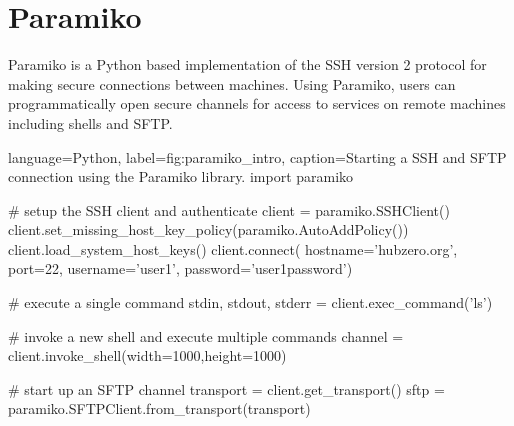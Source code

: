 


\section{Paramiko}
\label{sec:external_libs_paramiko}


Paramiko \cite{Paramiko:Online} is a Python based implementation of the SSH
version 2 protocol for making secure connections between machines.  Using
Paramiko, users can programmatically open secure channels for access to
services on remote machines including shells and SFTP.

\begin{xcode}{%
  language=Python,%
  label=fig:paramiko_intro,%
  caption={Starting a SSH and SFTP connection using the Paramiko library.}%
}
import paramiko

# setup the SSH client and authenticate
client = paramiko.SSHClient()
client.set_missing_host_key_policy(paramiko.AutoAddPolicy())
client.load_system_host_keys()
client.connect(
    hostname='hubzero.org',
    port=22,
    username='user1',
    password='user1password')

# execute a single command
stdin, stdout, stderr = client.exec_command('ls')

# invoke a new shell and execute multiple commands
channel = client.invoke_shell(width=1000,height=1000)

# start up an SFTP channel
transport = client.get_transport()
sftp = paramiko.SFTPClient.from_transport(transport)
\end{xcode}




